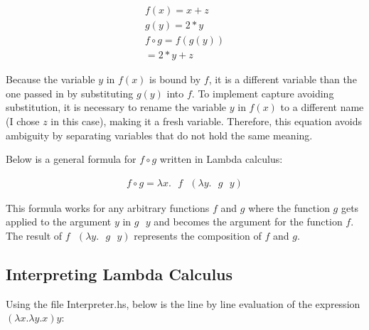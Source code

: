 \documentclass{article}
\theoremstyle{theorem}
\theoremstyle{definition}
\theoremstyle{remark}
\begin{document}
\begin{align}
f(x) = x + z \\
g(y) = 2 * y \\
f \circ g = f(g(y)) \\
= 2 * y + z
\end{align}

Because the variable $y$ in $f(x)$ is bound by $f$, it is a different variable than the one passed in by substituting $g(y)$ into $f$. To implement capture avoiding substitution, it is necessary to rename the variable $y$ in $f(x)$ to a different name (I chose $z$ in this case), making it a fresh variable. Therefore, this equation avoids ambiguity by separating variables that do not  hold the same meaning.

Below is a general formula for $f \circ g$ written in Lambda calculus:

\begin{align}
f \circ g = \lambda x. \text{ } f\text{ } (\lambda y. \text{ } g \text{ } y)
\end{align}

This formula works for any arbitrary functions $f$ and $g$ where the function $g$ gets applied to the argument $y$ in $g \text{ } y$ and becomes the argument for the function $f$. The result of $f \text{ } (\lambda y. \text{ } g \text{ } y)$ represents the composition of $f$ and $g$.

\subsection{Interpreting Lambda Calculus}

Using the file Interpreter.hs, below is the line by line evaluation of the expression $(\lambda x. \lambda y. x)y$:
\end{document}
